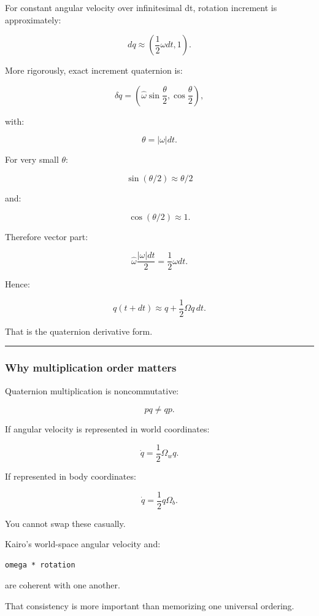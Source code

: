For constant angular velocity over infinitesimal dt, rotation increment is approximately:

\[
dq
\approx
\left(
\frac12\omega dt,
1
\right).
\]

More rigorously, exact increment quaternion is:

\[
\delta q
=
\left(
\hat\omega
\sin\frac{\theta}{2},
\cos\frac{\theta}{2}
\right),
\]

with:

\[
\theta
=
|\omega|dt.
\]

For very small \(\theta\):

\[
\sin(\theta/2)
\approx
\theta/2
\]

and:

\[
\cos(\theta/2)
\approx1.
\]

Therefore vector part:

\[
\hat\omega
\frac{|\omega|dt}{2}
=
\frac12\omega dt.
\]

Hence:

\[
q(t+dt)
\approx
q+
\frac12\Omega q\,dt.
\]

That is the quaternion derivative form.

\begin{center}\rule{0.5\linewidth}{0.5pt}\end{center}

\subsubsection{Why multiplication order matters}\label{why-multiplication-order-matters}

Quaternion multiplication is noncommutative:

\[
pq\neq qp.
\]

If angular velocity is represented in world coordinates:

\[
\dot q
=
\frac12\Omega_wq.
\]

If represented in body coordinates:

\[
\dot q
=
\frac12q\Omega_b.
\]

You cannot swap these casually.

Kairo's world-space angular velocity and:

\begin{verbatim}
omega * rotation
\end{verbatim}

are coherent with one another.

That consistency is more important than memorizing one universal ordering.

